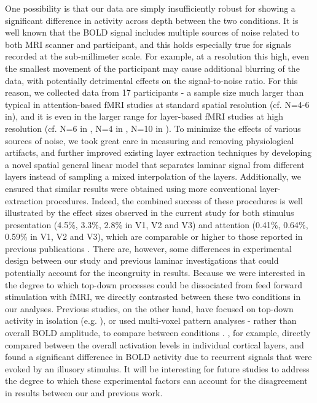 One possibility is that our data are simply insufficiently robust for showing a significant difference in activity across depth between the two conditions. It is well known that the BOLD signal includes multiple sources of noise related to both MRI scanner and participant, and this holds especially true for signals recorded at the sub-millimeter scale. For example, at a resolution this high, even the smallest movement of the participant may cause additional blurring of the data, with potentially detrimental effects on the signal-to-noise ratio. For this reason, we collected data from 17 participants - a sample size much larger than typical in attention-based fMRI studies at standard spatial resolution (cf. N=4-6 in\cite{Kastner1999,Kamitani2005,Jehee2011}), and it is even in the larger range for layer-based fMRI studies at high resolution (cf. N=6 in \cite{Polimeni2010}, N=4 in \cite{Muckli2015}, N=10 in \cite{Kok2016}). To minimize the effects of various sources of noise, we took great care in measuring and removing physiological artifacts, and further improved existing layer extraction techniques by developing a novel spatial general linear model that separates laminar signal from different layers instead of sampling a mixed interpolation of the layers. Additionally, we ensured that similar results were obtained using more conventional layer-extraction procedures. Indeed, the combined success of these procedures is well illustrated by the effect sizes observed in the current study for both stimulus presentation (4.5\%, 3.3\%, 2.8\% in V1, V2 and V3) and attention (0.41\%, 0.64\%, 0.59\% in V1, V2 and V3), which are comparable or higher to those reported in previous publications \cite{Murray2008,Jehee2011}. There are, however, some differences in experimental design between our study and previous laminar investigations that could potentially account for the incongruity in results. Because we were interested in the degree to which top-down processes could be dissociated from feed forward stimulation with fMRI, we directly contrasted between these two conditions in our analyses. Previous studies, on the other hand, have focused on top-down activity in isolation (e.g. \cite{Muckli2015, Kok2016}), or used multi-voxel pattern analyses - rather than overall BOLD amplitude, to compare between conditions \cite{Muckli2015}. \cite{Kok2016}, for example, directly compared between the overall activation levels in individual cortical layers, and found a significant difference in BOLD activity due to recurrent signals that were evoked by an illusory stimulus. It will be interesting for future studies to address the degree to which these experimental factors can account for the disagreement in results between our and previous work.

